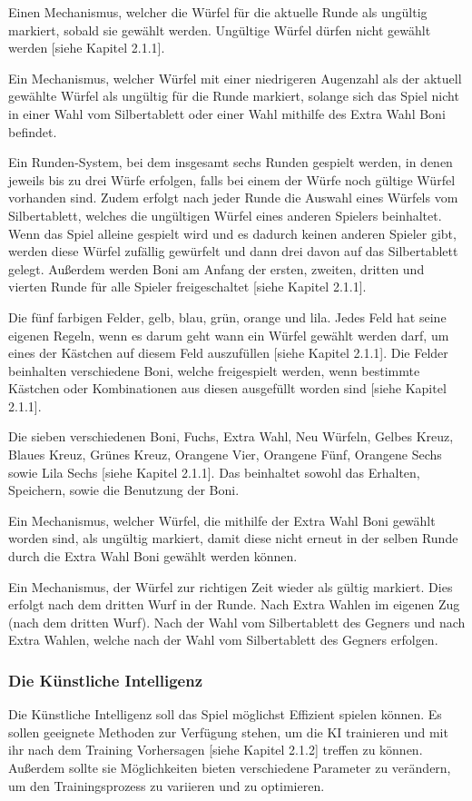 Einen Mechanismus, welcher die Würfel für die aktuelle Runde als ungültig markiert, sobald sie gewählt werden. Ungültige Würfel dürfen nicht gewählt werden [siehe Kapitel 2.1.1].

Ein Mechanismus, welcher Würfel mit einer niedrigeren Augenzahl als der aktuell gewählte Würfel als ungültig für die Runde markiert, solange sich das Spiel nicht in einer Wahl vom Silbertablett oder einer Wahl mithilfe des Extra Wahl Boni befindet.

Ein Runden-System, bei dem insgesamt sechs Runden gespielt werden, in denen jeweils bis zu drei Würfe erfolgen, falls bei einem der Würfe noch gültige Würfel vorhanden sind. Zudem erfolgt nach jeder Runde die Auswahl eines Würfels vom Silbertablett, welches die ungültigen Würfel eines anderen Spielers beinhaltet. Wenn das Spiel alleine gespielt wird und es dadurch keinen anderen Spieler gibt, werden diese Würfel zufällig gewürfelt und dann drei davon auf das Silbertablett gelegt. Außerdem werden Boni am Anfang der ersten, zweiten, dritten und vierten Runde für alle Spieler freigeschaltet [siehe Kapitel 2.1.1].

Die fünf farbigen Felder, gelb, blau, grün, orange und lila. Jedes Feld hat seine eigenen Regeln, wenn es darum geht wann ein Würfel gewählt werden darf, um eines der Kästchen auf diesem Feld auszufüllen [siehe Kapitel 2.1.1]. Die Felder beinhalten verschiedene Boni, welche freigespielt werden, wenn bestimmte Kästchen oder Kombinationen aus diesen ausgefüllt worden sind [siehe Kapitel 2.1.1].

Die sieben verschiedenen Boni, Fuchs, Extra Wahl, Neu Würfeln, Gelbes Kreuz, Blaues Kreuz, Grünes Kreuz, Orangene Vier, Orangene Fünf, Orangene Sechs sowie Lila Sechs [siehe Kapitel 2.1.1]. Das beinhaltet sowohl das Erhalten, Speichern, sowie die Benutzung der Boni.

Ein Mechanismus, welcher Würfel, die mithilfe der Extra Wahl Boni gewählt worden sind, als ungültig markiert, damit diese nicht erneut in der selben Runde durch die Extra Wahl Boni gewählt werden können.

Ein Mechanismus, der Würfel zur richtigen Zeit wieder als gültig markiert. Dies erfolgt nach dem dritten Wurf in der Runde. Nach Extra Wahlen im eigenen Zug (nach dem dritten Wurf). Nach der Wahl vom Silbertablett des Gegners und nach Extra Wahlen, welche nach der Wahl vom Silbertablett des Gegners erfolgen.
\subsubsection{Die Künstliche Intelligenz}
Die Künstliche Intelligenz soll das Spiel möglichst Effizient spielen können. Es sollen geeignete Methoden zur Verfügung stehen, um die KI trainieren und mit ihr nach dem Training Vorhersagen [siehe Kapitel 2.1.2] treffen zu können. Außerdem sollte sie Möglichkeiten bieten verschiedene Parameter zu verändern, um den Trainingsprozess zu variieren und zu optimieren. 

